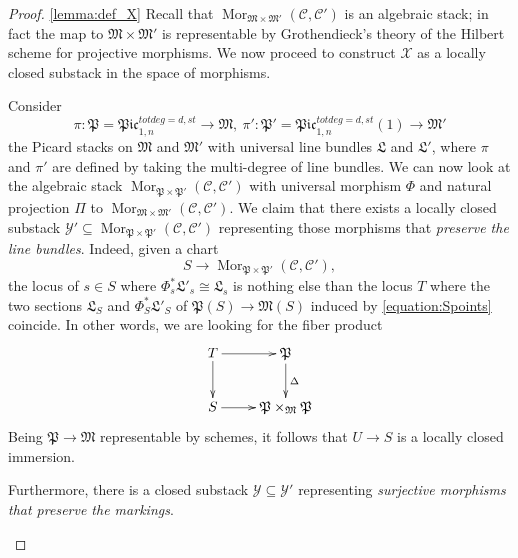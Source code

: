 \documentclass[11pt]{amsart}
\renewcommand{\to}{\rightarrow}
\theoremstyle{plain}
\theoremstyle{definition}
\begin{document}
\begin{proof}\ref{lemma:def_X}
Recall that $\operatorname{Mor}_{\mathfrak{M}\times\mathfrak{M}'}(\mathcal C,\mathcal C')$ is an algebraic stack; in fact the map to $\mathfrak{M}\times\mathfrak{M}'$ is representable by Grothendieck's theory of the Hilbert scheme for projective morphisms. We now proceed to construct $\mathcal X$ as a locally closed substack in the space of morphisms.

\begin{description}[labelindent=0cm,leftmargin=\parindent]

\item[Step 1] Consider
 \[\pi\colon\mathfrak{P}=\mathfrak{Pic}^{tot deg=d,st}_{1,n}\to\mathfrak{M},\ \pi'\colon\mathfrak{P}'=\mathfrak{Pic}^{tot deg=d,st}_{1,n}(1)\to\mathfrak{M}'\]
  the Picard stacks on $\mathfrak{M}$ and $\mathfrak{M'}$ with universal line bundles $\mathfrak{L}$ and $\mathfrak{L'}$, where $\pi$ and $\pi'$ are defined by taking the multi-degree of line bundles. We can now look at the algebraic stack $\operatorname{Mor}_{\mathfrak{P}\times\mathfrak{P}'}(\mathcal C,\mathcal C')$ with universal morphism
 $\Phi$ and natural projection $\Pi$ to $\operatorname{Mor}_{\mathfrak{M}\times\mathfrak{M}'}(\mathcal C,\mathcal C')$. We claim that there exists a locally closed substack $\mathcal{Y'}\subseteq \operatorname{Mor}_{\mathfrak{P}\times\mathfrak{P}'}(\mathcal C,\mathcal C')$ representing those morphisms that \emph{preserve the line bundles}. Indeed, given a chart 
 \begin{equation}\label{equation:Spoints} 
 S\to\operatorname{Mor}_{\mathfrak{P}\times\mathfrak{P}'}(\mathcal C,\mathcal C'),
  \end{equation} 
   the locus of $s\in S$ where $\Phi_s^*\mathfrak{L}'_s\cong\mathfrak{L}_s$ is nothing else than the locus $T$ where the two sections $\mathfrak{L}_S$ and $\Phi_S^*\mathfrak{L}'_S$ of $\mathfrak{P}(S)\to\mathfrak{M}(S)$ induced by \ref{equation:Spoints} coincide. In other words, we are looking for the fiber product 
  \[\xymatrix{T\ar[r]\ar[d]&\mathfrak{P}\ar[d]^{\Delta}\\
  S\ar[r]&\mathfrak{P}\times_{\mathfrak{M}}\mathfrak{P}}\]
Being $\mathfrak{P}\to\mathfrak{M}$ representable by schemes, it follows that $U\to S$ is a locally closed immersion.

\item[Step 2] 
Furthermore, there is a closed substack $\mathcal Y\subseteq \mathcal Y'$ representing \emph{surjective morphisms that preserve the markings}.


\end{description}
\end{proof}
\end{document}
